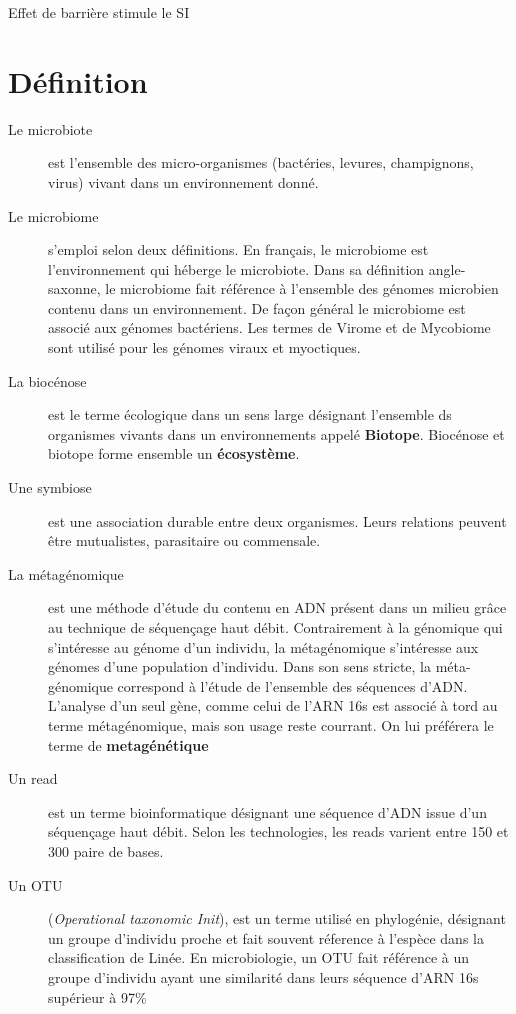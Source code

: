 \documentclass[12pt,a4paper]{article}
\begin{document}
Effet de barrière
stimule le SI

\newpage

\section{Définition}

\begin{description}
  \item[Le microbiote] est l’ensemble des micro-organismes (bactéries, levures, champignons, virus) vivant dans un environnement donné.
  
\item[Le microbiome] s’emploi selon deux définitions. En français, le microbiome est l'environnement qui héberge le microbiote. Dans sa définition angle-saxonne, le microbiome fait référence à l’ensemble des génomes microbien contenu dans un environnement. 
De façon général le microbiome est associé aux génomes bactériens. Les termes de Virome et de Mycobiome sont utilisé pour les génomes viraux et myoctiques. 

\item[La biocénose] est le terme écologique dans un sens large désignant l'ensemble ds organismes vivants dans un environnements appelé \textbf{Biotope}. Biocénose et biotope forme ensemble un \textbf{écosystème}.

\item[Une symbiose] est une association durable entre deux organismes. Leurs relations peuvent être mutualistes, parasitaire ou commensale.

\item[La métagénomique] est une méthode d’étude du contenu en ADN présent dans un milieu grâce au technique de séquençage haut débit. Contrairement à la génomique qui s’intéresse au génome d’un individu, la métagénomique s’intéresse aux génomes d’une population d’individu.
Dans son sens stricte, la méta-génomique correspond à l’étude de l’ensemble des séquences d’ADN. L’analyse d’un seul gène, comme celui de l’ARN 16s est associé à tord au terme métagénomique, mais son usage reste courrant. On lui préférera le terme de \textbf{metagénétique}

\item[Un read] est un terme bioinformatique désignant une séquence d’ADN issue d’un séquençage haut débit. Selon les technologies, les reads varient entre 150 et 300 paire de bases.

\item[Un OTU] (\textit{Operational taxonomic Init}), est un terme utilisé en phylogénie, désignant un groupe d’individu proche et fait souvent réference à l’espèce dans la classification de Linée.
En microbiologie, un OTU fait référence à un groupe d’individu ayant une similarité dans leurs séquence d'ARN 16s supérieur à 97\%


\end{description}
\end{document}
